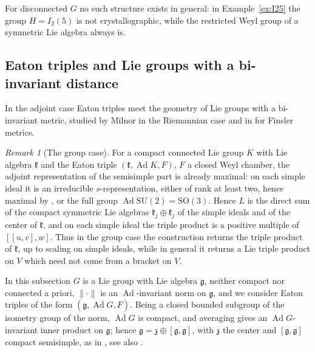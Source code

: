\documentclass[11pt]{amsart}
\theoremstyle{plain}
\theoremstyle{definition}
\theoremstyle{remark}
\newtheorem{remark}[theorem]{Remark}
\newcommand{\fg}{\mathfrak g}
\newcommand{\Ad}{\operatorname{Ad}}
\begin{document}
For disconnected $G$ no such structure exists in general: in Example~\ref{ex:I25} the group $H=I_2(5)$ is not crystallographic, while the restricted Weyl group of a symmetric Lie algebra always is.

\subsection{Eaton triples and Lie groups with a bi-invariant distance}\label{sec:biinvariant}

In the adjoint case Eaton triples meet the geometry of Lie groups with a bi-invariant metric, studied by Milnor \cite{Milnor} in the Riemannian case and in \cite{LR} for Finsler metrics.

\begin{remark}[The group case]\label{rem:group-case}
For a compact connected Lie group $K$ with Lie algebra $\mathfrak k$ and the Eaton triple $(\mathfrak k,\Ad K,F)$, $F$ a closed Weyl chamber, the adjoint representation of the semisimple part is already maximal: on each simple ideal it is an irreducible $s$-representation, either of rank at least two, hence maximal by \cite[Proposition~5.1]{EH}, or the full group $\Ad \mathrm{SU}(2)=\mathrm{SO}(3)$. Hence $L$ is the direct sum of the compact symmetric Lie algebras $\mathfrak k_j\oplus\mathfrak k_j$ of the simple ideals and of the center of $\mathfrak k$, and on each simple ideal the triple product is a positive multiple of $[[u,v],w]$. Thus in the group case the construction returns the triple product of $\mathfrak k$, up to scaling on simple ideals, while in general it returns a Lie triple product on $V$ which need not come from a bracket on $V$.
\end{remark}

In this subsection $G$ is a Lie group with Lie algebra $\fg$, neither compact nor connected a priori, $\|\cdot\|$ is an $\Ad$-invariant norm on $\fg$, and we consider Eaton triples of the form $(\fg,\overline{\Ad G},F)$. Being a closed bounded subgroup of the isometry group of the norm, $\overline{\Ad G}$ is compact, and averaging gives an $\Ad G$-invariant inner product on $\fg$; hence $\fg=\mathfrak z\oplus[\fg,\fg]$, with $\mathfrak z$ the center and $[\fg,\fg]$ compact semisimple, as in \cite{Milnor}, see also \cite[Corollary 4.25 and its proof]{Knapp}.
\end{document}
